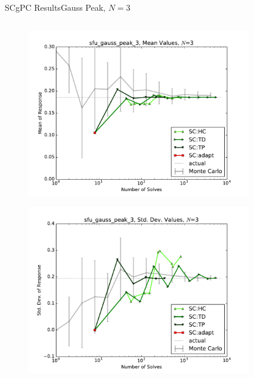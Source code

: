 \documentclass{beamer}
\begin{document}
\begin{frame}{SCgPC Results}{Gauss Peak, $N=3$}\vspace{-20pt}
 \begin{columns}
   \begin{column}{0.5\textwidth}
        \begin{figure}[h!]
          \centering
          \includegraphics[width=0.8\linewidth]{anlmodels/sfu_gauss_peak_3_mean_vals_nohdmr}
        \end{figure}
        \vspace{-20pt}
        \begin{figure}[h!]
          \centering
          \includegraphics[width=0.8\linewidth]{anlmodels/sfu_gauss_peak_3_var_vals_nohdmr}
        \end{figure}
   \end{column}
   \begin{column}{0.5\textwidth}
        \begin{figure}[h!]
          \centering

\end{figure}
\end{column}
\end{columns}
\end{frame}
\end{document}
